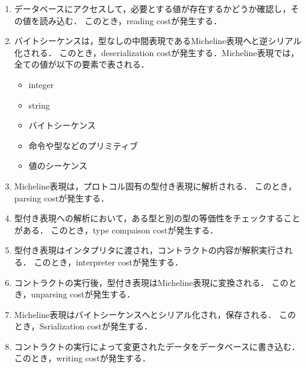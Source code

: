 \documentclass{kuisthesis}
\begin{document}
\begin{enumerate}
  \item データベースにアクセスして，必要とする値が存在するかどうか確認し，その値を読み込む．
  このとき，reading costが発生する．
  \item バイトシーケンスは，型なしの中間表現であるMicheline表現へと逆シリアル化される．
  このとき，deserialization costが発生する．Micheline表現では，全ての値が以下の要素で表される．
  \begin{itemize}
    \item integer
    \item string
    \item バイトシーケンス
    \item 命令や型などのプリミティブ
    \item 値のシーケンス
  \end{itemize}
  \item Micheline表現は，プロトコル固有の型付き表現に解析される．
  このとき，parsing costが発生する．
  \item 型付き表現への解析において，ある型と別の型の等価性をチェックすることがある．
  このとき，type compaison costが発生する．
  \item 型付き表現はインタプリタに渡され，コントラクトの内容が解釈実行される．
  このとき，interpreter costが発生する．
  \item コントラクトの実行後，型付き表現はMicheline表現に変換される．
  このとき，unparsing costが発生する．
  \item Micheline表現はバイトシーケンスへとシリアル化され，保存される．
  このとき，Ssrialization costが発生する．
  \item コントラクトの実行によって変更されたデータをデータベースに書き込む．
  このとき，writing costが発生する．
\end{enumerate}
\end{document}
